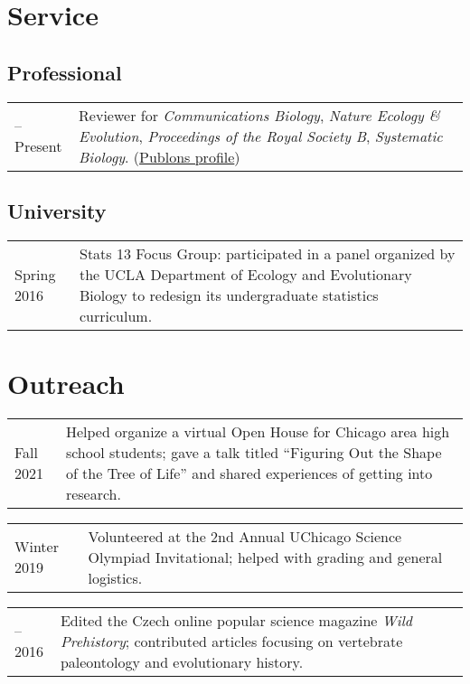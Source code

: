 \documentclass[10pt]{article}
\begin{document}
\section*{Service}

\subsection*{Professional}

\begin{tabularx}{\textwidth}{>{\raggedleft\arraybackslash}p{2.2cm} X}
2019--Present & Reviewer for \textit{Communications Biology}, \textit{Nature Ecology \& Evolution}, \textit{Proceedings of the Royal Society B}, \textit{Systematic Biology}. (\href{https://publons.com/a/3033367}{Publons profile})
\end{tabularx}

\subsection*{University}

\begin{tabularx}{\textwidth}{>{\raggedleft\arraybackslash}p{2.2cm} X}
Spring 2016 & Stats 13 Focus Group: participated in a panel organized by the UCLA Department of Ecology and Evolutionary Biology to redesign its undergraduate statistics curriculum.
\end{tabularx}

\section*{Outreach}

\begin{tabularx}{\textwidth}{>{\raggedleft\arraybackslash}p{2.2cm} X}
Fall 2021 & Helped organize a virtual Open House for Chicago area high school students; gave a talk titled ``Figuring Out the Shape of the Tree of Life'' and shared experiences of getting into research.
\end{tabularx}
\begin{tabularx}{\textwidth}{>{\raggedleft\arraybackslash}p{2.2cm} X}
Winter 2019 & Volunteered at the 2nd Annual UChicago Science Olympiad Invitational; helped with grading and general logistics.
\end{tabularx}
\begin{tabularx}{\textwidth}{>{\raggedleft\arraybackslash}p{2.2cm} X}
2015--2016 & Edited the Czech online popular science magazine \textit{Wild Prehistory}; contributed articles focusing on vertebrate paleontology and evolutionary history.
\end{tabularx}
\end{document}
